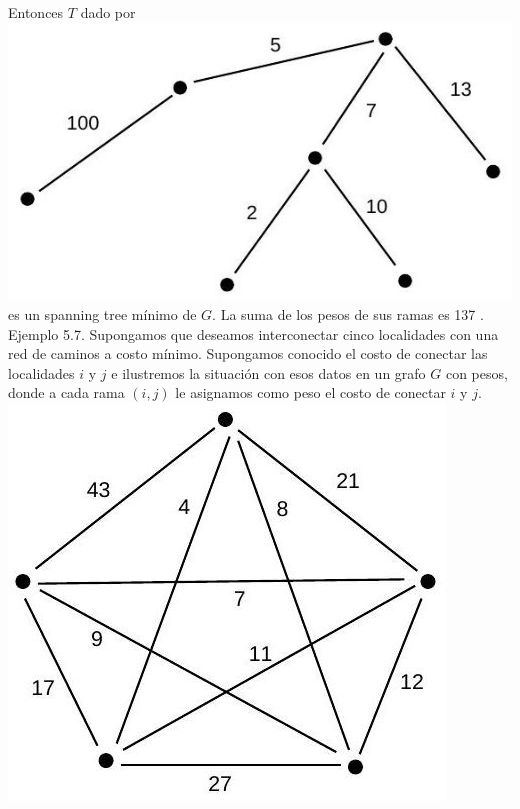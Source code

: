 \documentclass[10pt]{article}
\begin{document}
Entonces $T$ dado por\\
\includegraphics[max width=\textwidth, center]{2025_09_05_93c7c1835f249f70c0eeg-14(2)}\\
es un spanning tree mínimo de $G$. La suma de los pesos de sus ramas es 137 .\\
Ejemplo 5.7. Supongamos que deseamos interconectar cinco localidades con una red de caminos a costo mínimo. Supongamos conocido el costo de conectar las localidades $i$ y $j$ e ilustremos la situación con esos datos en un grafo $G$ con pesos, donde a cada rama $(i, j)$ le asignamos como peso el costo de conectar $i$ y $j$.\\
\includegraphics[max width=\textwidth, center]{2025_09_05_93c7c1835f249f70c0eeg-14}
\end{document}
